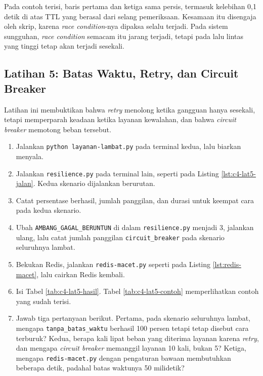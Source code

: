 Pada contoh terisi, baris pertama dan ketiga sama persis, termasuk kelebihan
0,1 detik di atas TTL yang berasal dari selang pemeriksaan. Kesamaan itu
disengaja oleh skrip, karena \textit{race condition}-nya dipaksa selalu
terjadi. Pada sistem sungguhan, \textit{race condition} semacam itu jarang
terjadi, tetapi pada lalu lintas yang tinggi tetap akan terjadi sesekali.

\subsection*{Latihan 5: Batas Waktu, Retry, dan Circuit Breaker}

Latihan ini membuktikan bahwa \textit{retry} menolong ketika gangguan hanya
sesekali, tetapi memperparah keadaan ketika layanan kewalahan, dan bahwa
\textit{circuit breaker} memotong beban tersebut.

\begin{enumerate}
  \item Jalankan \texttt{python layanan-lambat.py} pada terminal kedua, lalu
        biarkan menyala.
  \item Jalankan \texttt{resilience.py} pada terminal lain, seperti pada
        Listing \ref{lst:c4-lat5-jalan}. Kedua skenario dijalankan berurutan.
  \item Catat persentase berhasil, jumlah panggilan, dan durasi untuk keempat
        cara pada kedua skenario.
  \item Ubah \texttt{AMBANG\_GAGAL\_BERUNTUN} di dalam \texttt{resilience.py}
        menjadi 3, jalankan ulang, lalu catat jumlah panggilan
        \texttt{circuit\_breaker} pada skenario seluruhnya lambat.
  \item Bekukan Redis, jalankan \texttt{redis-macet.py} seperti pada Listing
        \ref{lst:redis-macet}, lalu cairkan Redis kembali.
  \item Isi Tabel \ref{tab:c4-lat5-hasil}. Tabel \ref{tab:c4-lat5-contoh}
        memperlihatkan contoh yang sudah terisi.
  \item Jawab tiga pertanyaan berikut. Pertama, pada skenario seluruhnya
        lambat, mengapa \texttt{tanpa\_batas\_waktu} berhasil 100 persen tetapi
        tetap disebut cara terburuk? Kedua, berapa kali lipat beban yang
        diterima layanan karena \textit{retry}, dan mengapa \textit{circuit breaker}
        memanggil layanan 10 kali, bukan 5? Ketiga, mengapa
        \texttt{redis-macet.py} dengan pengaturan bawaan membutuhkan beberapa
        detik, padahal batas waktunya 50 milidetik?
\end{enumerate}

